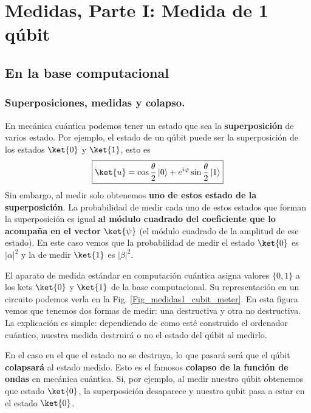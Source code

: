 \documentclass[a4paper,11pt]{book} %
\numberwithin{equation}{chapter}
\begin{document}
\chapter{Medidas, Parte I: Medida de 1 qúbit}

    \section{En la base computacional}
		\subsection{Superposiciones, medidas y colapso.}
	
En mecánica cuántica podemos tener un estado que sea la \textbf{superposición} de varios estado. Por ejemplo, el estado de un qúbit puede ser la superposición de los estados $\ket{0}$ y $\ket{1}$, esto es
	\begin{equation}
	\boxed{\ket{u} = \cos{\frac{\theta}{2}}\, |0\rangle + e^{i\varphi}\sin{\frac{\theta}{2}}\,|1\rangle }
	\end{equation}
Sin embargo, al medir solo obtenemos \textbf{uno de estos estado de la superposición}. La probabilidad de medir cada uno de estos estados que forman la superposición es igual 	\textbf{al módulo cuadrado del coeficiente que lo acompaña en el vector}  $\ket{\psi}$ (el módulo cuadrado de la amplitud de ese estado). En este caso vemos que la probabilidad de medir el estado $\ket{0}$ es $|\alpha|^2$ y la de medir $\ket{1}$ es $|\beta|^2$.


El aparato de medida estándar en computación cuántica asigna valores $\{0,1\}$ a los kets $\ket{0}$ y $\ket{1}$ de la base computacional. Su representación en un circuito podemos verla en la Fig. \ref{Fig_medidas1_cubit_meter}. En esta figura vemos que tenemos dos formas de medir: una destructiva y otra no destructiva. La explicación es simple: dependiendo de como esté construido el ordenador cuántico, nuestra medida destruirá o no el estado del qúbit al medirlo. 

En el caso en el que el estado no se destruya, lo que pasará será que el qúbit \textbf{colapsará} al estado medido. Esto es el famosos \textbf{colapso de la función de ondas} en mecánica cuántica. Si, por ejemplo, al medir nuestro qúbit obtenemos que estado $\ket{0}$, la superposición desaparece y nuestro qubit pasa a estar en el estado $\ket{0}$.
\end{document}
